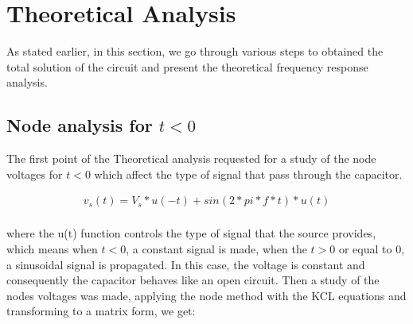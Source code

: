 
\section{Theoretical Analysis}
\label{sec:analysis}

\par As stated earlier, in this section, we go through various steps to obtained the total solution of the circuit and present the theoretical frequency response analysis.


\newpage 
\subsection{Node analysis for $t<0$} 

\par The first point of the Theoretical analysis requested for a study of the node voltages for $t<0$ which affect the type of signal that pass through the capacitor. 

\begin{align*}  
v_s(t)=V_s*u(-t)+sin(2*pi*f*t)*u(t)\\   
\end{align*} 

where the u(t) function controls the type of signal that the source provides, which means when $t<0$, a constant signal is made, when the $t>0$ or equal to 0, a sinusoidal signal is propagated.  
In this case, the voltage is constant and consequently the capacitor behaves like an open circuit. Then a study of the nodes voltages was made, applying the node method with the KCL equations and transforming to a matrix form, we get:

